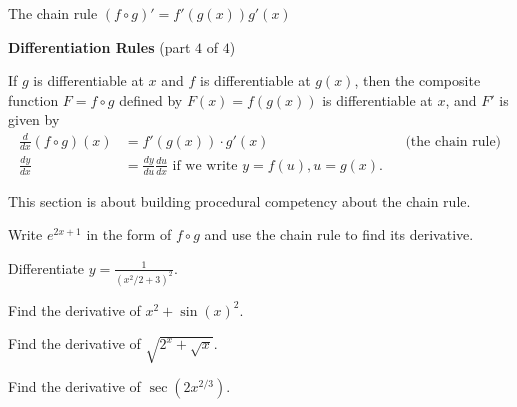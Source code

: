 \documentclass[../main.tex]{subfiles}
\begin{document}
\begin{lesson}{The chain rule\texorpdfstring{ \((f \circ g)' = f'(g(x))g'(x)\)}{}}
  \begin{mdframed}[style=simple]
    \textbf{Differentiation Rules} \hfill {\footnotesize (part \(4\) of \(4\))}

    If \(g\) is differentiable at \(x\) and \(f\) is differentiable at \(g(x)\), then the composite function \(F = f \circ g\) defined by \(F(x) = f(g(x))\) is differentiable at \(x\), and \(F'\) is given by 
    \begin{align*}
      \frac{d}{dx} (f \circ g)(x)
    &= f'(g(x)) \cdot g'(x)
    &&\text{(the chain rule)}\\[1em]
    \frac{dy}{dx} &= \frac{dy}{du} \frac{du}{dx} \text{ if we write } y = f(u), u = g(x).
    \end{align*}
  \end{mdframed}
  This section is about building procedural competency about the chain rule.

  \begin{example}
    Write \(e^{2x + 1}\) in the form of \(f \circ g\) and use the chain rule to find its derivative.

  \end{example}


  \begin{example}
    Differentiate \(y = \frac{1}{(x^{2}/2 + 3)^{2}}\).

  \end{example}
  \clearpage{}


  \begin{example}
    Find the derivative of \(x^{2} + \sin(x)^{2}\).

  \end{example}


  \begin{example}
    Find the derivative of \(\sqrt{2^{x} + \sqrt{x}}\).

  \end{example}


  \begin{example}
    Find the derivative of \(\sec(2x^{2/3})\).
    
  \end{example}
\end{lesson}
\end{document}
